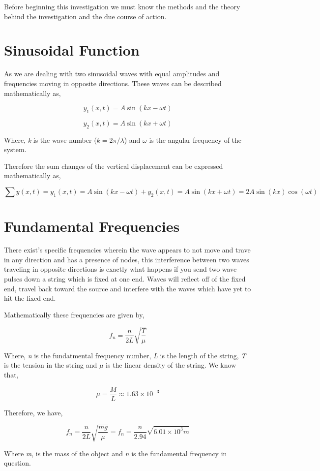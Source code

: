 {Before beginning this investigation we must know the methods and the theory behind the investigation and the due course of action.}

\section{{Sinusoidal Function}}

	{As we are dealing with two sinusoidal waves with equal amplitudes and frequencies moving in opposite directions. These waves can be described mathematically as,}

		$$y_1(x, t) = A\sin(kx-\omega t)$$
		
		$$y_2(x, t) = A\sin(kx+\omega t)$$

	{Where, \textit{k} is the wave number ($k = 2\pi /\lambda$) and $\omega$ is the angular frequency of the system.}

	{Therefore the sum changes of the vertical displacement can be expressed mathematically as,}

		$$\sum{y(x, t)} = y_1(x, t) = A\sin(kx-\omega t) + y_2(x, t) = A\sin(kx+\omega t) = 2A\sin(kx)\cos(\omega t)$$

	{}
		
\section{{Fundamental Frequencies}}

	{There exist's specific frequencies wherein the wave appears to not move and trave in any direction and has a presence of nodes, this interference between two waves traveling in opposite directions is exactly what happens if you send two wave pulses down a string which is fixed at one end. Waves will reflect off of the fixed end, travel back toward the source and interfere with the waves which have yet to hit the fixed end.}
	
	{Mathematically these frequencies are given by,}
		
		$$f_{n} = \frac{n}{2L}\sqrt{\frac{T}{\mu}}$$
		
	{Where, \textit{n} is the fundatmental frequency number, \textit{L} is the length of the string, \textit{T} is the tension in the string and $\mu$ is the linear density of the string. We know that,}
	
		$$\mu = \frac{M}{L} \approx 1.63\times 10^{-3}$$

	{Therefore, we have,}		
		
		$$f_{n} = \frac{n}{2L}\sqrt{\frac{mg}{\mu}} = f_{n} = \frac{n}{2.94}\sqrt{6.01\times 10^{3} m}$$

	{Where \textit{m}, is the mass of the object and \textit{n} is the fundamental frequency in question.}

			
			